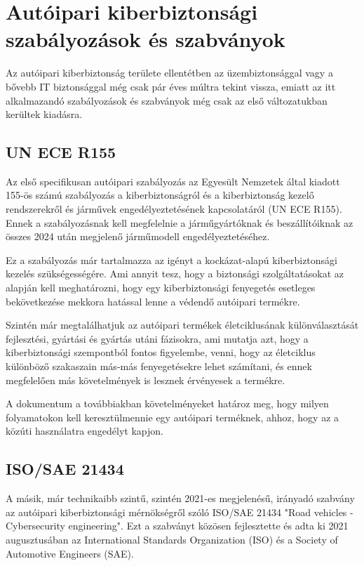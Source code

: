 \section{Autóipari kiberbiztonsági szabályozások és szabványok}

Az autóipari kiberbiztonság területe ellentétben az üzembiztonsággal vagy a bővebb IT biztonsággal még csak pár éves múltra tekint vissza, emiatt az itt alkalmazandó szabályozások és szabványok még csak az első változatukban kerültek kiadásra. 

\subsection{UN ECE R155}
Az első specifikusan autóipari szabályozás az Egyesült Nemzetek által kiadott 155-ös számú szabályozás a kiberbiztonságról és a kiberbiztonság kezelő rendszerekről és járművek engedélyeztetésének kapcsolatáról (UN ECE R155\cite{R155}). Ennek a szabályozásnak kell megfelelnie a járműgyártóknak és beszállítóiknak az összes 2024 után megjelenő járműmodell engedélyeztetéséhez.

Ez a szabályozás már tartalmazza az igényt a kockázat-alapú kiberbiztonsági kezelés szükségességére. Ami annyit tesz, hogy a biztonsági szolgáltatásokat az alapján kell meghatározni, hogy egy kiberbiztonsági fenyegetés esetleges bekövetkezése mekkora hatással lenne a védendő autóipari termékre.

Szintén már megtalálhatjuk az autóipari termékek életciklusának különválasztását fejlesztési, gyártási és gyártás utáni fázisokra, ami mutatja azt, hogy a kiberbiztonsági szempontból fontos figyelembe, venni, hogy az életciklus különböző szakaszain más-más fenyegetésekre lehet számítani, és ennek megfelelően más követelmények is lesznek érvényesek a termékre.

A dokumentum a továbbiakban követelményeket határoz meg, hogy milyen folyamatokon kell keresztülmennie egy autóipari terméknek, ahhoz, hogy az a közúti használatra engedélyt kapjon. 

\subsection{ISO/SAE 21434}

A másik, már technikaibb szintű, szintén 2021-es megjelenésű, irányadó szabvány az autóipari kiberbiztonsági mérnökségről szóló ISO/SAE 21434 "Road vehicles - Cybersecurity engineering"\cite{ISO21434}. Ezt a szabványt közösen fejlesztette és adta ki 2021 augusztusában az International Standards Organization (ISO) és a Society of Automotive Engineers (SAE).


